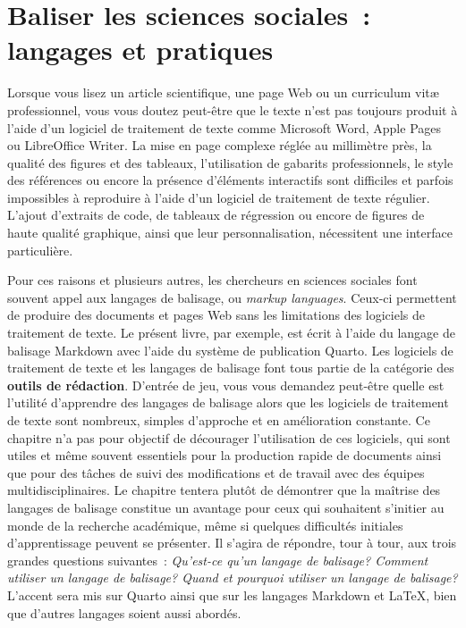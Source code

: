 \documentclass[
  letterpaper,
  DIV=11,
  numbers=noendperiod]{scrreprt}
\begin{document}

\chapter{Baliser les sciences sociales~: langages et
pratiques}\label{sec-chap7}

Lorsque vous lisez un article scientifique, une page Web ou un
curriculum vitæ professionnel, vous vous doutez peut-être que le texte
n'est pas toujours produit à l'aide d'un logiciel de traitement de texte
comme Microsoft Word, Apple Pages ou LibreOffice Writer. La mise en page
complexe réglée au millimètre près, la qualité des figures et des
tableaux, l'utilisation de gabarits professionnels, le style des
références ou encore la présence d'éléments interactifs sont difficiles
et parfois impossibles à reproduire à l'aide d'un logiciel de traitement
de texte régulier. L'ajout d'extraits de code, de tableaux de régression
ou encore de figures de haute qualité graphique, ainsi que leur
personnalisation, nécessitent une interface particulière.

Pour ces raisons et plusieurs autres, les chercheurs en sciences
sociales font souvent appel aux langages de balisage, ou \emph{markup
languages}. Ceux-ci permettent de produire des documents et pages Web
sans les limitations des logiciels de traitement de texte. Le présent
livre, par exemple, est écrit à l'aide du langage de balisage Markdown
avec l'aide du système de publication Quarto. Les logiciels de
traitement de texte et les langages de balisage font tous partie de la
catégorie des \textbf{outils de rédaction}. D'entrée de jeu, vous vous
demandez peut-être quelle est l'utilité d'apprendre des langages de
balisage alors que les logiciels de traitement de texte sont nombreux,
simples d'approche et en amélioration constante. Ce chapitre n'a pas
pour objectif de décourager l'utilisation de ces logiciels, qui sont
utiles et même souvent essentiels pour la production rapide de documents
ainsi que pour des tâches de suivi des modifications et de travail avec
des équipes multidisciplinaires. Le chapitre tentera plutôt de démontrer
que la maîtrise des langages de balisage constitue un avantage pour ceux
qui souhaitent s'initier au monde de la recherche académique, même si
quelques difficultés initiales d'apprentissage peuvent se présenter. Il
s'agira de répondre, tour à tour, aux trois grandes questions
suivantes~: \emph{Qu'est-ce qu'un langage de balisage? Comment utiliser
un langage de balisage? Quand et pourquoi utiliser un langage de
balisage?} L'accent sera mis sur Quarto ainsi que sur les langages
Markdown et \LaTeX, bien que d'autres langages soient aussi abordés.
\end{document}
